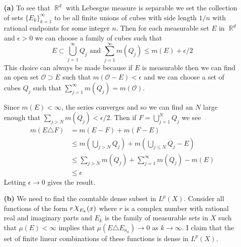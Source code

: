 \documentclass{article}
\DeclareMathOperator{\R}{\mathbb{R}}
\DeclareMathOperator{\capchi}{\raisebox{2pt}{$\mathlarger{\mathlarger{\chi}}$}}
\newcommand{\exercise}[1]{\noindent{\textbf{Exercise #1:}}}
\newcommand{\seq}[2]{\{#1_{#2}\}_{#2 = 1}^\infty}
\begin{document}
\exercise{1.8.10}
\begin{enumerate}
\item [\textbf{(a)}] To see that $\R^d$ with Lebesgue measure is
  separable we set the collection of sets $\seq{E}{k}$ to be all
  finite unions of cubes with side length $1/n$ with rational
  endpoints for some integer $n$. Then for each measurable set $E$ in
  $\R^d$ and $\epsilon > 0$ we can choose a family of cubes such that
  \[
  E \subset \bigcup_{j=1}^\infty Q_j \text{ and } \sum_{j=1}^\infty
  m(Q_j) \leq m(E) + \epsilon/2
  \]
  This choice can always be made because if $E$ is measurable then we
  can find an open set $\mathcal{O} \supset E$ such that
  $m(\mathcal{O}-E) < \epsilon$ and we can choose a set of cubes $Q_j$
  such that $\sum_{j=1}^\infty m(Q_j) = m(\mathcal{O})$.

  Since $m(E) < \infty$, the series converges and so we can find an
  $N$ large enough that $\sum_{j > N}m(Q_j) < \epsilon/2$. Then if $F
  = \bigcup_{j=1}^N Q_j$ we see
  \begin{align*}
    m(E\triangle F) &= m(E - F) + m(F - E) \\
    &\leq m\left(\bigcup_{j > N} Q_j\right) + m\left(\bigcup_{j \leq
        N} Q_j - E\right) \\
    &\leq \sum_{j > N} m(Q_j) + \sum_{j=1}^\infty m(Q_j) - m(E) \\
    &\leq \epsilon
  \end{align*}
  Letting $\epsilon \to 0$ gives the result.
\item [\textbf{(b)}] We need to find the countable dense subset in
  $L^p(X)$. Consider all functions of the form $r\capchi_{E_k}(x)$
  where $r$ is a complex number with rational real and imaginary parts
  and $E_k$ is the family of measurable sets in $X$ such that $\mu(E)
  < \infty$ implies that $\mu(E\triangle E_{n_k}) \to 0$ as $k \to
  \infty$. I claim that the set of finite linear combinations of these
  functions is dense in $L^p(X)$.


\end{enumerate}
\end{document}
